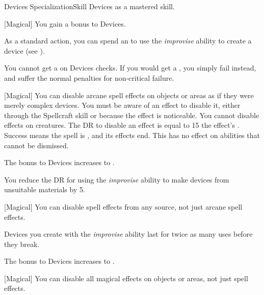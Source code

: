     \begin{feat}{Devices Specialization}{Skill}
        \featpre Devices as a mastered skill.
        \featben

        [Magical] You gain a  bonus to Devices.

         As a standard action, you can spend an  to use the \textit{improvise} ability to create a device (see ).

         You cannot get a  on Devices checks.
        If you would get a , you simply fail instead, and suffer the normal penalties for non-critical failure.

        [Magical] You can disable arcane spell effects on objects or areas as if they were merely complex devices.
        You must be aware of an effect to disable it, either through the Spellcraft skill or because the effect is noticeable.
        You cannot disable effects on creatures.
        The DR to disable an effect is equal to 15 \add the effect's .
        Success means the spell is , and its effects end.
        This has no effect on abilities that cannot be dismissed.

         The bonus to Devices increases to .

         You reduce the DR for using the \textit{improvise} ability to make devices from unsuitable materials by 5.

        [Magical] You can disable spell effects from any source, not just arcane spell effects.

         Devices you create with the \textit{improvise} ability last for twice as many uses before they break.

         The bonus to Devices increases to .

        [Magical] You can disable all magical effects on objects or areas, not just spell effects.
    \end{feat}

